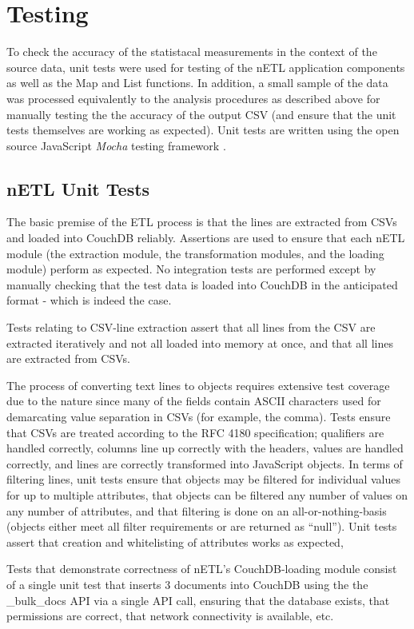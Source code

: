 \section{Testing}
To check the accuracy of the statistacal measurements in the context of the source data, unit tests were used for testing of the nETL application components as well as the Map and List functions. In addition, a small sample of the data was processed equivalently to the analysis procedures as described above for manually testing the the accuracy of the output CSV (and ensure that the unit tests themselves are working as expected). Unit tests are written using the open source JavaScript \textit{Mocha} testing framework \cite{mochaTest}.

\subsection{nETL Unit Tests}
The basic premise of the ETL process is that the lines are extracted from CSVs and loaded into CouchDB reliably. Assertions are used to ensure that each nETL module (the extraction module, the transformation modules, and the loading module) perform as expected. No integration tests are performed except by manually checking that the test data is loaded into CouchDB in the anticipated format - which is indeed the case.

Tests relating to CSV-line extraction assert that all lines from the CSV are extracted iteratively and not all loaded into memory at once, and that all lines are extracted from CSVs.

The process of converting text lines to objects requires extensive test coverage due to the nature since many of the fields contain ASCII characters used for demarcating value separation in CSVs (for example, the comma). Tests ensure that CSVs are treated according to the RFC 4180 specification; qualifiers are handled correctly, columns line up correctly with the headers, values are handled correctly, and lines are correctly transformed into JavaScript objects. In terms of filtering lines, unit tests ensure that objects may be filtered for individual values for up to multiple attributes, that objects can be filtered any number of values on any number of attributes, and that filtering is done on an all-or-nothing-basis (objects either meet all filter requirements or are returned as ``null''). Unit tests assert that creation and whitelisting of attributes works as expected,

Tests that demonstrate correctness of nETL's CouchDB-loading module consist of a single unit test that inserts 3 documents into CouchDB using the the \_bulk\_docs API via a single API call, ensuring that the database exists, that permissions are correct, that network connectivity is available, etc.


